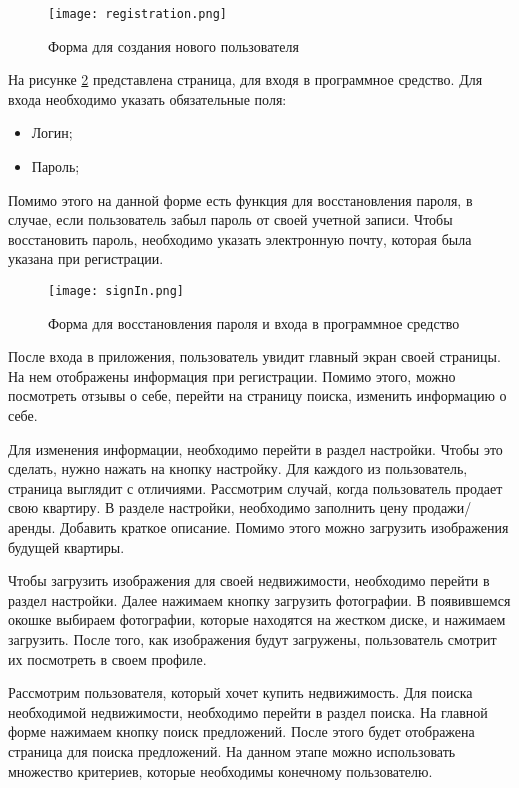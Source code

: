 \begin{figure}[!htb]
	\centering
	\texttt{[image: registration.png]}
	\caption{ Форма для создания нового пользователя }
	\label{fig:sec_usage::reg}
\end{figure}

На рисунке \ref{fig:sec_usage::signIn} представлена страница, для входя в программное средство. Для входа необходимо указать обязательные поля:

\begin{itemize}
	\item Логин; 
	\item Пароль;
\end{itemize}

Помимо этого на данной форме есть функция для восстановления пароля, в случае, если пользователь забыл пароль от своей учетной записи. Чтобы восстановить пароль, необходимо указать электронную почту, которая была указана при регистрации.

\begin{figure}[!htb]
	\centering
	\texttt{[image: signIn.png]}
	\caption{ Форма для восстановления пароля и входа в программное средство}
	\label{fig:sec_usage::signIn}
\end{figure}

После входа в приложения, пользователь увидит главный экран своей страницы. На нем отображены информация при регистрации. Помимо этого, можно посмотреть отзывы о себе, перейти на страницу поиска, изменить информацию о себе.

Для изменения информации, необходимо перейти в раздел настройки. Чтобы это сделать, нужно нажать на кнопку настройку. Для каждого из пользователь, страница выглядит с отличиями. Рассмотрим случай, когда пользователь продает свою квартиру. В разделе настройки, необходимо заполнить цену продажи/аренды. Добавить краткое описание. Помимо этого можно загрузить изображения будущей квартиры. 

Чтобы загрузить изображения для своей недвижимости, необходимо перейти в раздел настройки. Далее нажимаем кнопку загрузить фотографии. В появившемся окошке выбираем фотографии, которые находятся на жестком диске, и нажимаем загрузить. После того, как изображения будут загружены, пользователь смотрит их посмотреть в своем профиле.

Рассмотрим пользователя, который хочет купить недвижимость. Для поиска необходимой недвижимости, необходимо перейти в раздел поиска. На главной форме нажимаем кнопку поиск предложений. После этого будет отображена страница для поиска предложений. На данном этапе можно использовать множество критериев, которые необходимы конечному пользователю. 
   

